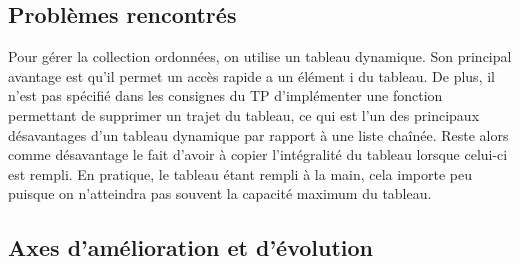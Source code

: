 \documentclass[a4paper]{article}
\begin{document}
\subsection{Problèmes rencontrés}
Pour gérer la collection ordonnées, on utilise un tableau dynamique. Son principal avantage est qu'il permet un accès rapide a un élément i du tableau. De plus, il n'est pas spécifié dans les consignes du TP d'implémenter une fonction permettant de supprimer un trajet du tableau, ce qui est l'un des principaux désavantages d'un tableau dynamique par rapport à une liste chaînée. Reste alors comme désavantage le fait d'avoir à copier l'intégralité du tableau lorsque celui-ci est rempli. En pratique, le tableau étant rempli à la main, cela importe peu puisque on n'atteindra pas souvent la capacité maximum du tableau.

\subsection{Axes d'amélioration et d'évolution}










\end{document}
